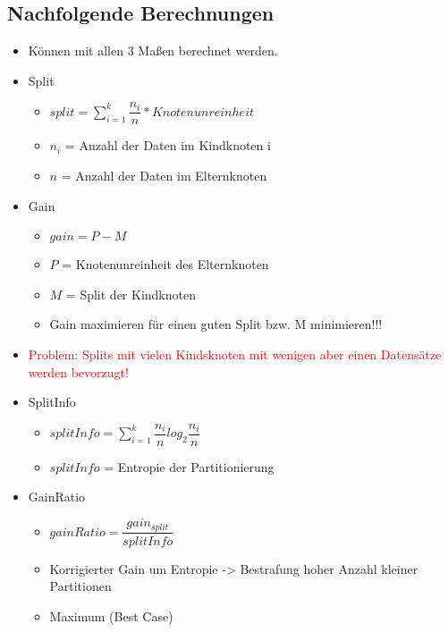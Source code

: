 \documentclass[a4paper]{article}
\begin{document}
\begin{landscape}
\begin{multicols}{3}
        \subsection{Nachfolgende Berechnungen}
        \begin{itemize}[noitemsep,nolistsep]
            \item Können mit allen 3 Maßen berechnet werden.
            \item Split
                    \begin{itemize}[noitemsep,nolistsep]
                        \item $ split = \sum_{i = 1}^{k} \dfrac{n_i}{n} * Knotenunreinheit$
                        \item $n_i$ = Anzahl der Daten im Kindknoten i
                        \item $n$ = Anzahl der Daten im Elternknoten
                    \end{itemize}
            \item Gain
                    \begin{itemize}[noitemsep,nolistsep]
                        \item $ gain = P - M$
                        \item $P$ = Knotenunreinheit des Elternknoten
                        \item $M$ = Split der Kindknoten
                        \item Gain maximieren für einen guten Split bzw. M minimieren!!!
                    \end{itemize}
            \item \textcolor{red}{Problem: Splits mit vielen Kindsknoten mit wenigen aber einen Datensätze werden bevorzugt!}
            \item SplitInfo
                    \begin{itemize}[noitemsep,nolistsep]
                        \item $ splitInfo = \sum_{i = 1}^{k} \dfrac{n_i}{n} log_2 \dfrac{n_i}{n}$
                        \item $splitInfo$ = Entropie der Partitionierung
                    \end{itemize}
            \item GainRatio
                    \begin{itemize}[noitemsep,nolistsep]
                        \item $ gainRatio = \dfrac{gain_{split}}{splitInfo}$
                        \item Korrigierter Gain um Entropie -> Bestrafung hoher Anzahl kleiner Partitionen
                        \item Maximum (Best Case)
                    \end{itemize}
        \end{itemize}


\end{multicols}
\end{landscape}
\end{document}
